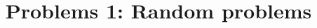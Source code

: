 \documentclass[a4paper,12pt]{extarticle}
\begin{document}
    \title{Problems 1: Random problems}

    \begin{problems}
        \item 
        \item
    \end{problems}
\end{document}
